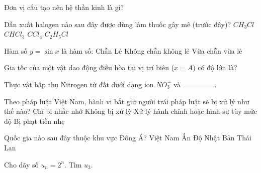 \begin{ex}
    Đơn vị cấu tạo nên hệ thần kinh là gì?

\end{ex}

\begin{ex}
    Dẫn xuất halogen nào sau đây được dùng làm thuốc gây mê (trước đây)?
    \choice
    {$CH_3Cl$}
    {\True $CHCl_3$}
    {$CCl_4$}
    {$C_2H_5Cl$}
\end{ex}

\begin{ex}
    Hàm số $y = \sin x$ là hàm số:
    \choice
    {Chẵn}
    {\True Lẻ}
    {Không chẵn không lẻ}
    {Vừa chẵn vừa lẻ}
\end{ex}

\begin{ex}
    Gia tốc của một vật dao động điều hòa tại vị trí biên ($x = A$) có độ lớn là?

\end{ex}

\begin{ex}
    Thực vật hấp thụ Nitrogen từ đất dưới dạng ion $NO_3^-$ và ______.
\end{ex}

\begin{ex}
    Theo pháp luật Việt Nam, hành vi bắt giữ người trái pháp luật sẽ bị xử lý như thế nào?
    \choice
    {Chỉ bị nhắc nhở}
    {Không bị xử lý}
    {\True Xử lý hành chính hoặc hình sự tùy mức độ}
    {Bị phạt tiền nhẹ}
\end{ex}

\begin{ex}
    Quốc gia nào sau đây thuộc khu vực Đông Á?
    \choice
    {Việt Nam}
    {Ấn Độ}
    {\True Nhật Bản}
    {Thái Lan}
\end{ex}

\begin{ex}
    Cho dãy số $u_n = 2^n$. Tìm $u_3$.
\end{ex}

